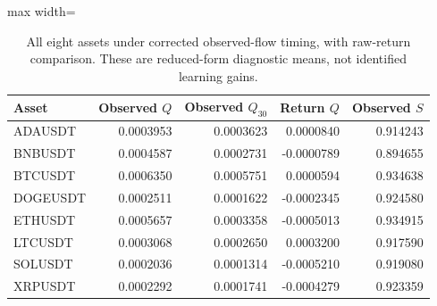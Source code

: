 \begin{table}[htbp]
\centering\small
\caption{All eight assets under corrected observed-flow timing, with raw-return comparison. These are reduced-form diagnostic means, not identified learning gains.}\label{tab:restored_panel_assets}
\begin{adjustbox}{max width=\textwidth}
\begin{tabular}{lrrrr}\toprule
Asset & Observed $Q$ & Observed $Q_{30}$ & Return $Q$ & Observed $S$\\\midrule
ADAUSDT & 0.0003953 & 0.0003623 & 0.0000840 & 0.914243\\
BNBUSDT & 0.0004587 & 0.0002731 & -0.0000789 & 0.894655\\
BTCUSDT & 0.0006350 & 0.0005751 & 0.0000594 & 0.934638\\
DOGEUSDT & 0.0002511 & 0.0001622 & -0.0002345 & 0.924580\\
ETHUSDT & 0.0005657 & 0.0003358 & -0.0005013 & 0.934915\\
LTCUSDT & 0.0003068 & 0.0002650 & 0.0003200 & 0.917590\\
SOLUSDT & 0.0002036 & 0.0001314 & -0.0005210 & 0.919080\\
XRPUSDT & 0.0002292 & 0.0001741 & -0.0004279 & 0.923359\\
\bottomrule\end{tabular}
\end{adjustbox}
\end{table}

